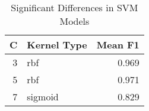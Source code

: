 \begin{table}
\centering
\caption{Significant Differences in SVM Models}
\label{tab:svm_significant_pairs_hepatitis}
\begin{tabular}{rlr}
\toprule
C & Kernel Type & Mean F1 \\
\midrule
3 & rbf & 0.969 \\
5 & rbf & 0.971 \\
7 & sigmoid & 0.829 \\
\bottomrule
\end{tabular}
\end{table}
